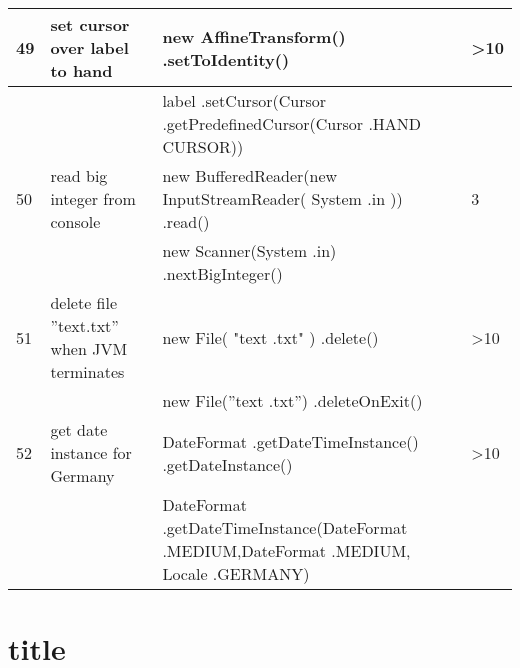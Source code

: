 \begin{longtable}{|p{}|p{}|p{}|p{}|}
		\rowcolor[HTML]{FFCCC9} 
		49                                & set cursor over label to hand                          & new AffineTransform() .setToIdentity()                                                                           & \textgreater{}10                        \\ \hline
		\rowcolor[HTML]{9AFF99} 
		&                                                        & label .setCursor(Cursor .getPredefinedCursor(Cursor .HAND CURSOR))                                               &                                         \\ \hline
		\rowcolor[HTML]{FFCCC9} 
		50                                & read big integer from console                          & new BufferedReader(new InputStreamReader( System .in )) .read()                                                  & 3                                       \\ \hline
		\rowcolor[HTML]{9AFF99} 
		&                                                        & new Scanner(System .in) .nextBigInteger()                                                                        &                                         \\ \hline
		\rowcolor[HTML]{FFCCC9} 
		51                                & delete file ”text.txt” when JVM terminates             & new File( "text .txt" )  .delete()                                                                               & \textgreater{}10                        \\ \hline
		\rowcolor[HTML]{9AFF99} 
		&                                                        & new File(”text .txt”) .deleteOnExit()                                                                            &                                         \\ \hline
		\rowcolor[HTML]{FFCCC9} 
		52                                & get date instance for Germany                          & DateFormat .getDateTimeInstance() .getDateInstance()                                                             & \textgreater{}10                        \\ \hline
		\rowcolor[HTML]{9AFF99} 
		&                                                        & DateFormat .getDateTimeInstance(DateFormat .MEDIUM,DateFormat .MEDIUM, Locale .GERMANY)                          &                                         \\ \hline
		
\end{longtable}

\section{title}




